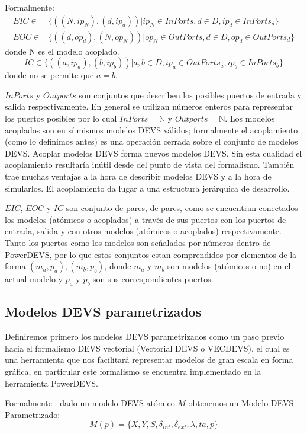 	Formalmente:
	\begin{align*}
	EIC \in& \{((N, ip_N ), (d, ip_d )) | ip_N \in InPorts, d \in D, ip_d \in InPorts_d \} \\
	EOC \in& \{((d, op_d ), (N, op_N ))  | op_N \in OutPorts, d \in D, op_d \in OutPorts_d \}
	\end{align*}
	donde N es el modelo acoplado.
	\begin{equation*}
	IC \in \{((a, ip_a ), (b, ip_b )) | a, b \in D, ip_a \in OutPorts_a , ip_b \in InPorts_b \}
	\end{equation*}
	donde no se permite que $a = b$.

	$InPorts$ y $Outports$ son conjuntos que describen los posibles puertos de entrada y salida respectivamente. En general se utilizan números enteros 
	para representar los puertos posibles por lo cual $InPorts = \mathbb{N}$ y $Outports = \mathbb{N}$. Los modelos acoplados son en sí mismos modelos 
	DEVS válidos; formalmente el acoplamiento (como lo definimos antes) es una operación cerrada sobre el conjunto de modelos DEVS. Acoplar modelos DEVS 
	forma nuevos modelos DEVS. Sin esta cualidad el acoplamiento resultaría inútil desde del punto de vista del formalismo. También trae muchas ventajas 
	a la hora de describir modelos DEVS y a la hora de simularlos. El acoplamiento da lugar a una estructura jerárquica de desarrollo.

	$EIC$, $EOC$ y $IC$ son conjunto de pares, de pares, como se encuentran conectados los modelos (atómicos o acoplados) a través de sus puertos con los 
	puertos de entrada, salida y con otros modelos (atómicos o acoplados) respectivamente. Tanto los puertos como los modelos son señalados por números 
	dentro de PowerDEVS, por lo que estos conjuntos estan comprendidos por elementos de la forma $(m_a, p_a), (m_b, p_b)$, donde $m_a$ y $m_b$ 
	son modelos (atómicos o no) en el actual modelo y $p_a$ y $p_b$ son sus correspondientes puertos.


	\subsection{Modelos DEVS parametrizados}
	Definiremos primero los modelos DEVS parametrizados\cite{BKC12} como un paso previo hacia el formalismo DEVS vectorial (Vectorial DEVS o VECDEVS), 
	el cual es una herramienta que nos facilitará representar modelos de gran escala en forma gráfica, en particular este formalismo se encuentra implementado 
	en la herramienta PowerDEVS.

	Formalmente : dado un modelo DEVS atómico $M$ obtenemos un Modelo DEVS Parametrizado:
	\begin{equation}
	M (p) = \{X, Y, S, \delta_{int}, \delta_{ext} ,\lambda , ta, p\}
	\end{equation}

